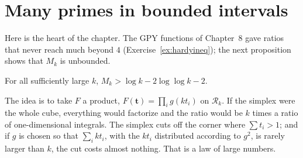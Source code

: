 \section{Many primes in bounded intervals}

Here is the heart of the chapter. The GPY functions of Chapter~8 gave ratios that never reach much beyond $4$ (Exercise~\ref{ex:hardyineq}); the next proposition shows that $M_k$ is unbounded.

\begin{proposition}[Maynard]\label{prop:mklower}
For all sufficiently large $k$, $M_k>\log k-2\log\log k-2$.
\end{proposition}

The idea is to take $F$ a product, $F(\mathbf t)=\prod_ig(kt_i)$ on $\mathcal R_k$. If the simplex were the whole cube, everything would factorize and the ratio would be $k$ times a ratio of one-dimensional integrals. The simplex cuts off the corner where $\sum t_i>1$; and if $g$ is chosen so that $\sum_i kt_i$, with the $kt_i$ distributed according to $g^2$, is rarely larger than $k$, the cut costs almost nothing. That is a law of large numbers.

